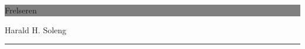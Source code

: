 

\begin{titlepage} %
	
\setcounter{page}{-1}
	
	\colorbox{grey}{
		\parbox[t]{0.93\textwidth}{ 
			\parbox[t]{0.91\textwidth}{ 
				\raggedleft
				\fontsize{50pt}{80pt}\selectfont 
				\vspace{0.7cm} 
				
				Frelseren
				
				\vspace{0.7cm}
			}
		}
	}
	
	\vfill 
	
	
	\parbox[t]{0.93\textwidth}{ 
		\raggedleft 
		\large 
		    {\Large Harald H. Soleng}\\[4pt] 
                    \date\\
		
		\hfill\rule{0.2\linewidth}{1pt}
	}
	
\end{titlepage}
